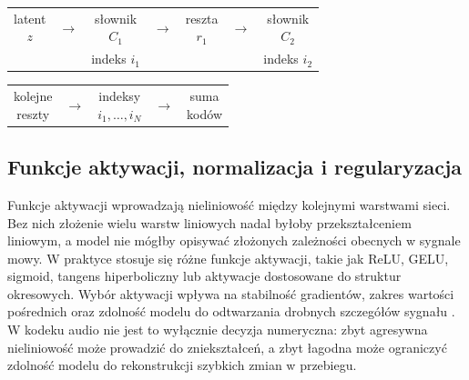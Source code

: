 \begin{center}
\centering
\footnotesize
\setlength{\tabcolsep}{2pt}
\begin{tabular}{c c c c c c c}
\fbox{\parbox{0.11\textwidth}{\centering latent\\\(z\)}} &
\(\rightarrow\) &
\fbox{\parbox{0.12\textwidth}{\centering słownik\\\(C_1\)}} &
\(\rightarrow\) &
\fbox{\parbox{0.12\textwidth}{\centering reszta\\\(r_1\)}} &
\(\rightarrow\) &
\fbox{\parbox{0.12\textwidth}{\centering słownik\\\(C_2\)}} \\
 & & indeks \(i_1\) & & & & indeks \(i_2\) \\
\end{tabular}

\vspace{0.4em}

\begin{tabular}{c c c c c}
\fbox{\parbox{0.12\textwidth}{\centering kolejne\\reszty}} &
\(\rightarrow\) &
\fbox{\parbox{0.16\textwidth}{\centering indeksy\\\(i_1,\ldots,i_N\)}} &
\(\rightarrow\) &
\fbox{\parbox{0.16\textwidth}{\centering suma\\kodów}} \\
\end{tabular}
\label{fig:rvq-reszty}
\end{center}

\subsection{Funkcje aktywacji, normalizacja i regularyzacja}
\label{subsec:aktywacje-normalizacja-regularyzacja}

Funkcje aktywacji wprowadzają nieliniowość między kolejnymi warstwami sieci. Bez nich złożenie wielu warstw liniowych nadal byłoby przekształceniem liniowym, a model nie mógłby opisywać złożonych zależności obecnych w sygnale mowy. W praktyce stosuje się różne funkcje aktywacji, takie jak ReLU, GELU, sigmoid, tangens hiperboliczny lub aktywacje dostosowane do struktur okresowych. Wybór aktywacji wpływa na stabilność gradientów, zakres wartości pośrednich oraz zdolność modelu do odtwarzania drobnych szczegółów sygnału \cite{Goodfellow2016DeepLearning}. W kodeku audio nie jest to wyłącznie decyzja numeryczna: zbyt agresywna nieliniowość może prowadzić do zniekształceń, a zbyt łagodna może ograniczyć zdolność modelu do rekonstrukcji szybkich zmian w przebiegu.

